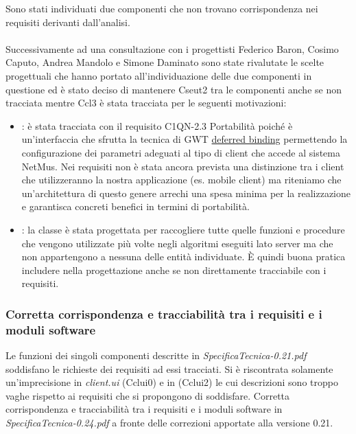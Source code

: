 Sono stati individuati due componenti che non trovano corrispondenza nei
requisiti derivanti dall'analisi. \\\\ 
Successivamente ad una consultazione con i progettisti Federico Baron, Cosimo
Caputo, Andrea Mandolo e Simone Daminato sono state rivalutate le scelte
progettuali che hanno portato all'individuazione delle due componenti in
questione ed \`e stato deciso di mantenere Cseut2 tra le componenti anche se non
tracciata mentre Ccl3 \`e stata tracciata per le seguenti motivazioni:
\begin{itemize}
  \item{: \`e stata tracciata con il requisito
  C1QN-2.3 Portabilit\`a poich\'e  \`e un'interfaccia che
  sfrutta la tecnica di GWT \underline{deferred binding} permettendo la
  configurazione dei parametri adeguati al tipo di client che accede al sistema
  NetMus. Nei requisiti non \`e stata ancora prevista una distinzione tra i
  client che utilizzeranno la nostra applicazione (es. mobile client) ma
  riteniamo che un'architettura di questo genere arrechi una spesa minima per la
  realizzazione e garantisca concreti benefici in termini di portabilit\`a.}
  \item{: la classe  \`e stata progettata per raccogliere
  tutte quelle funzioni e procedure che vengono utilizzate pi\`u volte negli
  algoritmi eseguiti lato server ma che non appartengono a nessuna delle entit\`a
  individuate. \`E quindi buona pratica includere  nella progettazione
  anche se non direttamente tracciabile con i requisiti.}
\end{itemize}


\subsubsection*{Corretta corrispondenza e tracciabilit\`a tra i requisiti e  i
moduli software} 
Le funzioni dei singoli componenti descritte in
\emph{SpecificaTecnica-0.21.pdf} soddisfano le richieste dei requisiti ad essi
tracciati. Si \`e riscontrata solamente un'imprecisione in \emph{client.ui}
(Cclui0) e in  (Cclui2) le cui descrizioni sono troppo vaghe
rispetto ai requisiti che si propongono di soddisfare. 
Corretta corrispondenza e tracciabilit\`a tra i requisiti e  i
moduli software in \emph{SpecificaTecnica-0.24.pdf} a fronte delle correzioni
apportate alla versione 0.21. 


